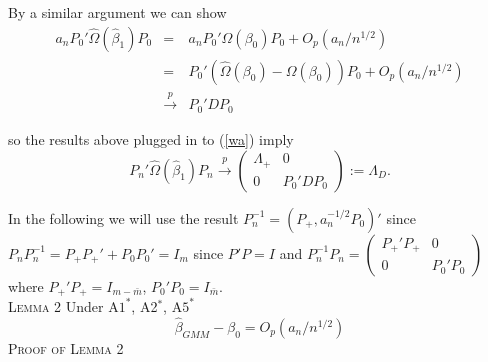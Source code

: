 \documentclass[11pt, fleqn]{article}
\begin{document}
By a similar argument we can show
\begin{eqnarray} 
a_nP_0'\hat{\Omega}(\hat{\beta}_1)P_0
&=&a_n P_0'\hat{\Omega}(\beta_0)P_0 +O_p(a_n/n^{1/2}) \\ &=& P_0'(\hat{\Omega}(\beta_0)-\Omega(\beta_0))P_0 +O_p(a_n/n^{1/2}) 
\label{cc1} \\
 &\overset{p}{\rightarrow}& P_0'DP_0 \label{bb2} 
 \end{eqnarray}
 
 so the  results above plugged in to (\ref{wa}) imply
\begin{equation}
P_n'\hat{\Omega}(\hat{\beta}_1)P_n \overset{p}{\rightarrow}  \left(\begin{array}{cc} \Lambda_+ & 0 \\ 0 & P_0'DP_0 \end{array} \right):=\Lambda_D. \end{equation}

In the following we will use the result  $P_n^{-1}=(P_+,a_n^{-1/2}P_0)'$  since $P_nP_n^{-1}=P_+P_+'+P_0P_0'=I_m$ since $P'P=I$ and
$P_n^{-1}P_n=\left(\begin{array}{cc} P_+'P_+ & 0 \\ 0 & P_0'P_0 \end{array} \right)$ where $P_+'P_+=I_{m-\bar{m}}$, $P_0'P_0=I_{\bar{m}}$.\\

\textsc{Lemma 2} Under A$1^*$, A2$^*$, A$5^*$ \begin{equation}\hat{\beta}_{GMM}-\beta_0=O_p(a_n/n^{1/2}) \end{equation}
\textsc{Proof of Lemma 2}\\
\end{document}
